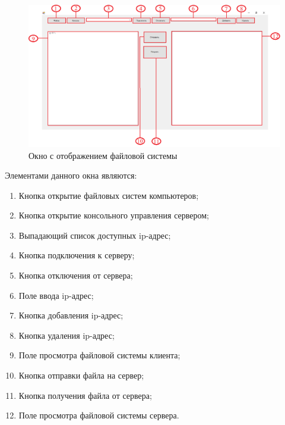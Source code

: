 \begin{figure}
	\centering
	\includegraphics[width=1\linewidth]{"images/Окно с файлами"}
	\caption{Окно с отображением файловой системы}
	\label{fig:-window-file}
\end{figure}

Элементами данного окна являются:
\begin{enumerate}
	\item Кнопка открытие файловых систем компьютеров;
	\item Кнопка открытие консольного управления сервером;
	\item Выпадающий список доступных ip-адрес;
	\item Кнопка подключения к серверу;
	\item Кнопка отключения от сервера;
	\item Поле ввода ip-адрес;
	\item Кнопка добавления ip-адрес;
	\item Кнопка удаления ip-адрес;
	\item Поле просмотра файловой системы клиента;
	\item Кнопка отправки файла на сервер;
	\item Кнопка получения файла от сервера;
	\item Поле просмотра файловой системы сервера.
\end{enumerate}
